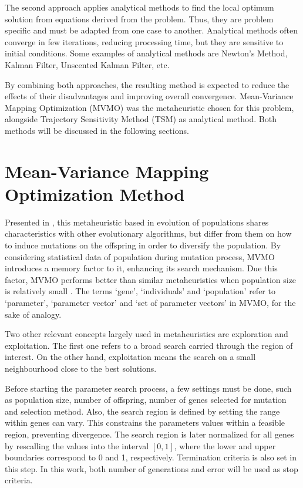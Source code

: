 The second approach applies analytical methods to find the local optimum solution from equations derived from the problem. Thus, they are problem specific and must be adapted from one case to another. Analytical methods often converge in few iterations, reducing processing time, but they are sensitive to initial conditions. Some examples of analytical methods are Newton's Method, Kalman Filter, Unscented Kalman Filter, etc.

By combining both approaches, the resulting method is expected to reduce the effects of their disadvantages and improving overall convergence. Mean-Variance Mapping Optimization (MVMO) was the metaheuristic chosen for this problem, alongside Trajectory Sensitivity Method (TSM) as analytical method. Both methods will be discussed in the following sections.

\section{Mean-Variance Mapping Optimization Method}

Presented in \cite{Erlich2010}, this metaheuristic based in evolution of populations shares characteristics with other evolutionary algorithms, but differ from them on how to induce mutations on the offspring in order to diversify the population. By considering statistical data of population during mutation process, MVMO introduces a memory factor to it, enhancing its search mechanism. Due this factor, MVMO performs better than similar metaheuristics when population size is relatively small \cite{Nakawiro2011}. The terms `gene', `individuals' and `population' refer to `parameter', `parameter vector' and `set of parameter vectors' in MVMO, for the sake of analogy.

Two other relevant concepts largely used in metaheuristics are exploration and exploitation. The first one refers to a broad search carried through the region of interest. On the other hand, exploitation means the search on a small neighbourhood close to the best solutions.

Before starting the parameter search process, a few settings must be done, such as population size, number of offspring, number of genes selected for mutation and selection method. Also, the search region is defined by setting the range within genes can vary. This constrains the parameters values within a feasible region, preventing divergence. The search region is later normalized for all genes  by rescalling the values into the interval $[0, 1]$, where the lower and upper boundaries correspond to 0 and 1, respectively. Termination criteria is also set in this step. In this work, both number of generations and error will be used as stop criteria.

